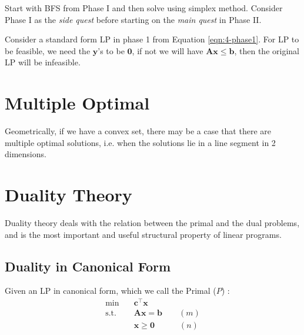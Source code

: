\documentclass{article}
\begin{document}
Start with BFS from Phase I and then solve using simplex method. Consider Phase I as the \textit{side quest} before starting on the \textit{main quest} in Phase II. 

Consider a standard form LP in phase 1 from Equation \ref{eqn:4-phase1}. For LP to be feasible, we need the $\mathbf{y}$'s to be $\mathbf{0}$, if not we will have $\mathbf{Ax} \leq \mathbf{b}$, then the original LP will be infeasible. 


\section{Multiple Optimal}
Geometrically, if we have a convex set, there may be a case that there are multiple optimal solutions, i.e. when the solutions lie in a line segment in 2 dimensions. 

\section{Duality Theory}

Duality theory deals with the relation between the primal and the dual problems, and is the most important and useful structural property of linear programs. 

\subsection{Duality in Canonical Form}

Given an LP in canonical form, which we call the Primal ($P$) : \begin{align*}
    \min \quad & \mathbf{c}^{\top} \mathbf{x} \\ 
    \text{s.t.} \quad & \mathbf{Ax} = \mathbf{b} \qquad (m)\\ 
    \quad & \mathbf{x} \geq \mathbf{0} \qquad \quad (n)
\end{align*}
\end{document}
